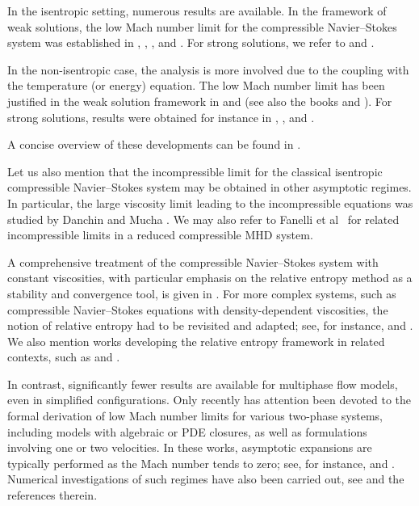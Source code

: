 \documentclass[11pt, twoside, a4paper]{article}
\theoremstyle{plain}
\theoremstyle{remark}
\numberwithin{equation}{section}
\begin{document}
In the isentropic setting, numerous results are available. In the framework of weak solutions, the low Mach number limit for the compressible Navier–Stokes system was established in \cite{lions1998incompressible}, \cite{desjardins1999incompressible}, \cite{desjardins1999low}, and \cite{bresch2002low}. For strong solutions, we refer to \cite{grenier1997oscillatory} and \cite{danchin2002zero}.

In the non-isentropic case, the analysis is more involved due to the coupling with the temperature (or energy) equation. The low Mach number limit has been justified in the weak solution framework in \cite{feireisl2007low} and \cite{feireisl2013inviscid} (see also the books \cite{lions1998mathematical} and \cite{feireisl2004dynamics}). For strong solutions, results were obtained for instance in \cite{metivier2001incompressible}, \cite{alazard2006low}, and \cite{alazard2005incompressible}.


A concise overview of these developments can be found in \cite{gallagher2005resultats}.

Let us also mention that the incompressible limit for the classical isentropic compressible Navier–Stokes system may be obtained in other asymptotic regimes. In particular, the large viscosity limit leading to the incompressible equations was studied by Danchin and Mucha \cite{danchin2013incompressible}. We may also refer to Fanelli et al~\cite{fanelli2025incompressible} for related incompressible limits in a reduced compressible MHD system.

A comprehensive treatment of the compressible Navier–Stokes system with constant viscosities, with particular emphasis on the relative entropy method as a stability and convergence tool, is given in \cite{feireisl2009singular}. For more complex systems, such as compressible Navier–Stokes equations with density-dependent viscosities, the notion of relative entropy had to be revisited and adapted; see, for instance, \cite{bresch2017relative} and \cite{bresch2019navier}. We also mention works developing the relative entropy framework in related contexts, such as \cite{feireisl2012relative} and \cite{sueur2014inviscid}.

In contrast, significantly fewer results are available for multiphase flow models, even in simplified configurations. Only recently has attention been devoted to the formal derivation of low Mach number limits for various two-phase systems, including models with algebraic or PDE closures, as well as formulations involving one or two velocities. In these works, asymptotic expansions are typically performed as the Mach number tends to zero; see, for instance, \cite{varsakelis2011low} and \cite{lebot2025low}. Numerical investigations of such regimes have also been carried out, see \cite{battisti2025linearly} and the references therein.\newline
\end{document}
